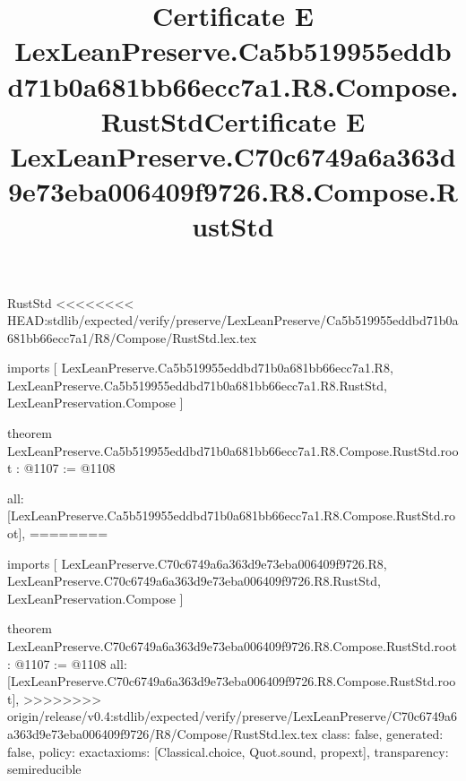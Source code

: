 \begin{lexlean}{RustStd}
<<<<<<<< HEAD:stdlib/expected/verify/preserve/LexLeanPreserve/Ca5b519955eddbd71b0a681bb66ecc7a1/R8/Compose/RustStd.lex.tex
\title{Certificate E LexLeanPreserve.Ca5b519955eddbd71b0a681bb66ecc7a1.R8.Compose.RustStd}
\begin{coremodule}
imports [
  LexLeanPreserve.Ca5b519955eddbd71b0a681bb66ecc7a1.R8,
  LexLeanPreserve.Ca5b519955eddbd71b0a681bb66ecc7a1.R8.RustStd,
  LexLeanPreservation.Compose
]

theorem LexLeanPreserve.Ca5b519955eddbd71b0a681bb66ecc7a1.R8.Compose.RustStd.root : @1107 := @1108 {
  all: [LexLeanPreserve.Ca5b519955eddbd71b0a681bb66ecc7a1.R8.Compose.RustStd.root],
========
\title{Certificate E LexLeanPreserve.C70c6749a6a363d9e73eba006409f9726.R8.Compose.RustStd}
\begin{coremodule}
imports [
  LexLeanPreserve.C70c6749a6a363d9e73eba006409f9726.R8,
  LexLeanPreserve.C70c6749a6a363d9e73eba006409f9726.R8.RustStd,
  LexLeanPreservation.Compose
]

theorem LexLeanPreserve.C70c6749a6a363d9e73eba006409f9726.R8.Compose.RustStd.root : @1107 := @1108 {
  all: [LexLeanPreserve.C70c6749a6a363d9e73eba006409f9726.R8.Compose.RustStd.root],
>>>>>>>> origin/release/v0.4:stdlib/expected/verify/preserve/LexLeanPreserve/C70c6749a6a363d9e73eba006409f9726/R8/Compose/RustStd.lex.tex
  class: false,
  generated: false,
  policy: exact{axioms: [Classical.choice, Quot.sound, propext]},
  transparency: semireducible
}


\end{coremodule}}
\end{coremodule}
\end{lexlean}
